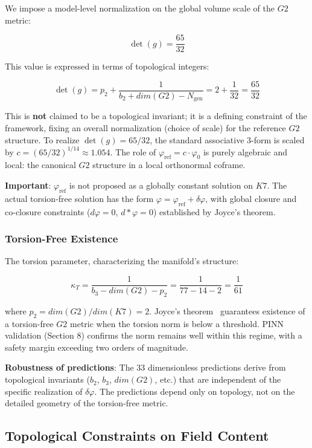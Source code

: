 \documentclass[11pt,a4paper]{article}
\newcommand{\Gtwo}{\mathrm{G}_2}
\newcommand{\Kseven}{K_7}
\newcommand{\dimE}{\mathrm{dim}}
\def\Gtwo{G2}%
\def\Kseven{K7}%
\def\dimE{dim}%
\begin{document}
We impose a model-level normalization on the global volume scale of the $\Gtwo$ metric:

$$\det(g) = \frac{65}{32}$$

This value is expressed in terms of topological integers:

$$\det(g) = p_2 + \frac{1}{b_2 + \dimE(\Gtwo) - N_{\mathrm{gen}}} = 2 + \frac{1}{32} = \frac{65}{32}$$

This is \textbf{not} claimed to be a topological invariant; it is a defining constraint of the framework, fixing an overall normalization (choice of scale) for the reference $\Gtwo$ structure. To realize $\det(g) = 65/32$, the standard associative 3-form is scaled by $c = (65/32)^{1/14} \approx 1.054$. The role of $\varphi_{\mathrm{ref}} = c \cdot \varphi_0$ is purely algebraic and local: the canonical $\Gtwo$ structure in a local orthonormal coframe.

\textbf{Important}: $\varphi_{\mathrm{ref}}$ is not proposed as a globally constant solution on $\Kseven$. The actual torsion-free solution has the form $\varphi = \varphi_{\mathrm{ref}} + \delta\varphi$, with global closure and co-closure constraints ($d\varphi = 0$, $d{*}\varphi = 0$) established by Joyce's theorem.

\subsubsection{Torsion-Free Existence}

The torsion parameter, characterizing the manifold's structure:

$$\kappa_T = \frac{1}{b_3 - \dimE(\Gtwo) - p_2} = \frac{1}{77 - 14 - 2} = \frac{1}{61}$$

where $p_2 = \dimE(\Gtwo)/\dimE(\Kseven) = 2$. Joyce's theorem~\cite{joyce2000} guarantees existence of a torsion-free $\Gtwo$ metric when the torsion norm is below a threshold. PINN validation (Section 8) confirms the norm remains well within this regime, with a safety margin exceeding two orders of magnitude.

\textbf{Robustness of predictions}: The 33 dimensionless predictions derive from topological invariants ($b_2$, $b_3$, $\dimE(\Gtwo)$, etc.) that are independent of the specific realization of $\delta\varphi$. The predictions depend only on topology, not on the detailed geometry of the torsion-free metric.

\subsection{Topological Constraints on Field Content}
\end{document}
